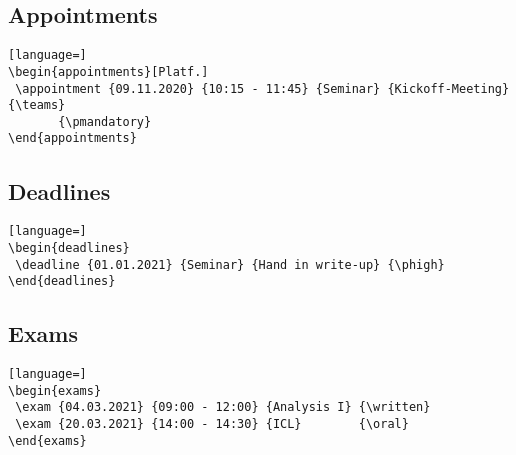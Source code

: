 \documentclass{article}
\begin{document}
	
	\subsection{Appointments}
	\begin{lstlisting}[language=]
\begin{appointments}[Platf.]		
 \appointment {09.11.2020} {10:15 - 11:45} {Seminar} {Kickoff-Meeting} {\teams} 
       {\pmandatory} 
\end{appointments}
	\end{lstlisting}
	\begin{appointments}[Platf.]		
	\end{appointments}


	\subsection{Deadlines}
	\begin{lstlisting}[language=]
\begin{deadlines}
 \deadline {01.01.2021} {Seminar} {Hand in write-up} {\phigh}
\end{deadlines}
	\end{lstlisting}
	\begin{deadlines}
	\end{deadlines}

	\subsection{Exams}
	\begin{lstlisting}[language=]
\begin{exams}
 \exam {04.03.2021} {09:00 - 12:00} {Analysis I} {\written}
 \exam {20.03.2021} {14:00 - 14:30} {ICL}        {\oral}
\end{exams}
	\end{lstlisting}
	\begin{exams}
	\end{exams}
\end{document}
